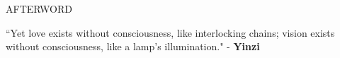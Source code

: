 \documentclass[11pt]{article}
\begin{document}
\vspace*{10\baselineskip}

\begingroup
\begin{center}
\huge AFTERWORD
\end{center}
\endgroup

\vspace*{3\baselineskip}

\begingroup
\begin{center}
\large ``Yet love exists without consciousness, like interlocking chains; vision exists without consciousness, like a lamp's illumination."
\rightskip\leftskip
\phantom{text} \hfill - \textbf{Yinzi}
\end{center}
\endgroup
\end{document}
